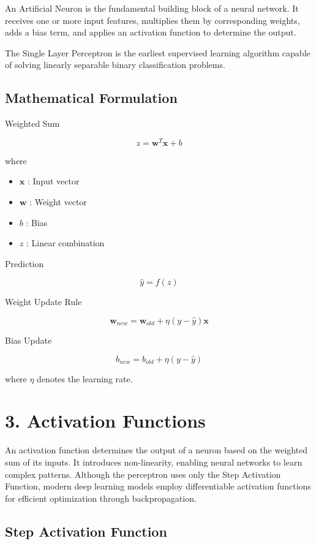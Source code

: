 \documentclass[11pt]{article}
\begin{document}
An Artificial Neuron is the fundamental building block of a neural network. It receives one or more input features, multiplies them by corresponding weights, adds a bias term, and applies an activation function to determine the output.

The Single Layer Perceptron is the earliest supervised learning algorithm capable of solving linearly separable binary classification problems.

\subsection*{Mathematical Formulation}

Weighted Sum

\[
z=\mathbf{w}^{T}\mathbf{x}+b
\]

where

\begin{itemize}
\item $\mathbf{x}$ : Input vector
\item $\mathbf{w}$ : Weight vector
\item $b$ : Bias
\item $z$ : Linear combination
\end{itemize}

Prediction

\[
\hat y=f(z)
\]

Weight Update Rule

\[
\mathbf{w}_{new}
=
\mathbf{w}_{old}
+
\eta
(y-\hat y)
\mathbf{x}
\]

Bias Update

\[
b_{new}
=
b_{old}
+
\eta
(y-\hat y)
\]

where $\eta$ denotes the learning rate.


\section*{3. Activation Functions}

An activation function determines the output of a neuron based on the weighted sum of its inputs. It introduces non-linearity, enabling neural networks to learn complex patterns. Although the perceptron uses only the Step Activation Function, modern deep learning models employ differentiable activation functions for efficient optimization through backpropagation.

\subsection*{Step Activation Function}
\end{document}

